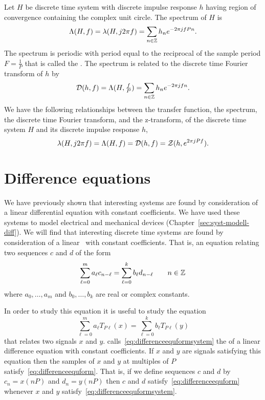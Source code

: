 Let $H$ be discrete time system with discrete impulse response $h$ having region of convergence containing the complex unit circle.  The spectrum of $H$ is
\[
\Lambda(H,f) = \lambda(H, j2\pi f) = \sum_{n \in {\mathbb Z}} h_n e^{-2\pi j f P n}.
\]
The spectrum is periodic with period equal to the reciprocal of the sample period $F = \frac{1}{P}$ that is called the . The spectrum is related to the discrete time Fourier transform of $h$ by
\[
{\mathcal D}(h,f) = \Lambda(H,\tfrac{f}{P}) =\sum_{n \in {\mathbb Z}} h_n e^{-2\pi j f n}.
\]
We have the following relationships between the transfer function, the spectrum, the discrete time Fourier transform, and the z-transform, of the discrete time system $H$ and its discrete impulse response $h$,
\[
\lambda(H, j2\pi f) = \Lambda(H,f) = {\mathcal D}(h,f) = {\mathcal Z}(h, e^{2\pi j P f}).
\]

\section{Difference equations}\label{sec:difference-equations}

\nocite{SolimanAndSrinath_1990}

We have previously shown that interesting systems are found by consideration of a linear differential equation with constant coefficients.  We have used these systems to model electrical and mechanical devices (Chapter~\ref{sec:syst-modell-diff}).  We will find that interesting discrete time systems are found by consideration of a linear~ with constant coefficients.  That is, an equation relating two sequences $c$ and $d$ of the form
\begin{equation}\label{eq:differenceequform}
\sum_{\ell=0}^{m} a_\ell c_{n - \ell} = \sum_{\ell=0}^{k} b_\ell d_{n - \ell} \qquad n \in {\mathbb Z}
\end{equation}
where $a_0,\dots,a_m$ and $b_0,\dots,b_k$ are real or complex constants.

In order to study this equation it is useful to study the equation
\begin{equation}\label{eq:differenceequformsystem}
\sum_{\ell=0}^{m} a_\ell T_{P\ell}(x) = \sum_{\ell=0}^{k} b_\ell T_{P\ell}(y)
\end{equation}
that relates two signals $x$ and $y$.  \citet[Sec.~9.5]{Zemanian_dist_theory_1965} calls~\eqref{eq:differenceequformsystem} the  of a linear difference equation with constant coefficients.  If $x$ and $y$ are signals satisfying this equation then the samples of $x$ and $y$ at multiples of $P$ satisfy~\eqref{eq:differenceequform}.  That is, if we define sequences $c$ and $d$ by $c_n = x(nP)$ and $d_n = y(nP)$ then $c$ and $d$ satisfy~\eqref{eq:differenceequform} whenever $x$ and $y$ satisfy~\eqref{eq:differenceequformsystem}.

